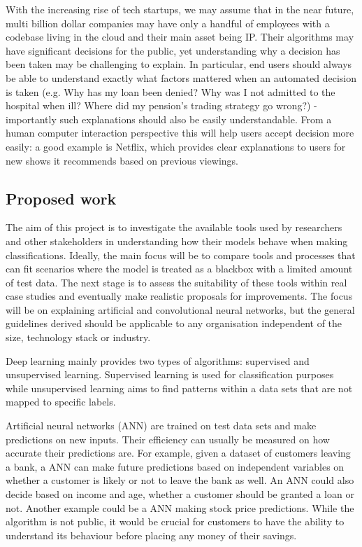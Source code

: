 \documentclass[proposal]{softeng}
\begin{document}
With the increasing rise of tech startups, we may assume that in the near future, multi billion dollar companies may have only a handful of employees with a codebase living in the cloud and their main asset being IP. Their algorithms may have significant decisions for the public, yet understanding why a decision has been taken may be challenging to explain. In particular, end users should always be able to understand exactly what factors mattered when an automated decision is taken (e.g. Why has my loan been denied? Why was I not admitted to the hospital when ill? Where did my pension's trading strategy go wrong?) - importantly such explanations should also be easily understandable. From a human computer interaction perspective this will help users accept decision more easily: a good example is Netflix, which provides clear explanations to users for new shows it recommends based on previous viewings. 

\subsection{Proposed work}

The aim of this project is to investigate the available tools used by researchers and other stakeholders in understanding how their models behave when making classifications. Ideally, the main focus will be to compare tools and processes that can fit scenarios where the model is treated as a blackbox with a limited amount of test data. The next stage is to assess the suitability of these tools within real case studies and eventually make realistic proposals for improvements. The focus will be on explaining artificial and convolutional neural networks, but the general guidelines derived should be applicable to any organisation independent of the size, technology stack or industry.

Deep learning mainly provides two types of algorithms: supervised and unsupervised learning. Supervised learning is used for classification purposes while unsupervised learning aims to find patterns within a data sets that are not mapped to specific labels.

Artificial neural networks (ANN) are trained on test data sets and make predictions on new inputs. Their efficiency can usually be measured on how accurate their predictions are. For example, given a dataset of customers leaving a bank, a ANN can make future predictions based on independent variables on whether a customer is likely or not to leave the bank as well. An ANN could also decide based on income and age, whether a customer should be granted a loan or not. Another example could be a ANN making stock price predictions. While the algorithm is not public, it would be crucial for customers to have the ability to understand its behaviour before placing any money of their savings.
\end{document}
